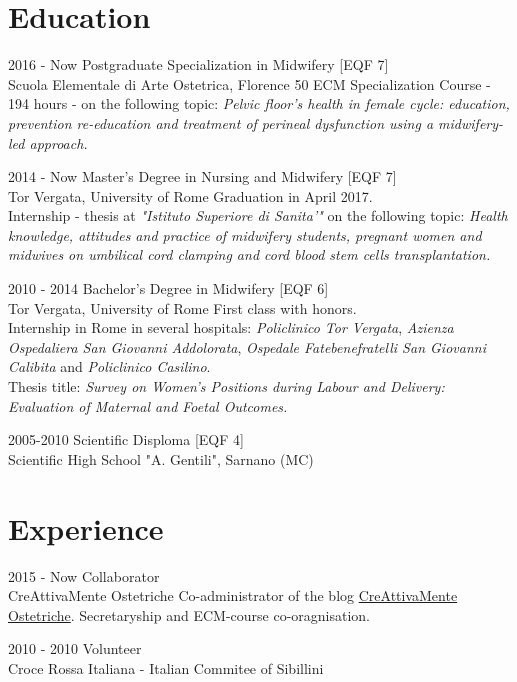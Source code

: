 \documentclass[]{friggeri-cv}
\begin{document}
\section{Education}
\begin{entrylist}
	\entry
	{2016 - Now}
	{Postgraduate Specialization in Midwifery [\small EQF 7]}
	{\\Scuola Elementale di Arte Ostetrica, Florence}
	{50 ECM Specialization Course - 194 hours - on the following topic: \emph{Pelvic floor's health in female cycle: education, prevention re-education and treatment of perineal dysfunction using a midwifery-led approach.}\\}
	
	\entry
	{2014 - Now}
	{Master's Degree in Nursing and Midwifery [\small EQF 7]}
	{\\Tor Vergata, University of Rome}
	{Graduation in April 2017. \\Internship - thesis at \textit{"Istituto Superiore di Sanita'"} on the following topic: \textit{Health knowledge, attitudes and practice of midwifery students, pregnant women and midwives on umbilical cord clamping and cord blood stem cells transplantation.}\\}
	
	\entry
	{2010 - 2014}
	{Bachelor's Degree in Midwifery [\small EQF 6]}
	{\\Tor Vergata, University of Rome}
	{First class with honors.\\
	Internship in Rome in several hospitals: \textit{Policlinico Tor Vergata}, \textit{Azienza Ospedaliera San Giovanni Addolorata}, \textit{Ospedale Fatebenefratelli San Giovanni Calibita} and \textit{Policlinico Casilino}.\\
	Thesis title: \textit{Survey on Women's Positions during Labour and Delivery: Evaluation of Maternal and Foetal Outcomes.}\\}

	\entry
	{2005-2010}
	{Scientific Disploma [\small EQF 4]}
	{\\Scientific High School "A. Gentili", Sarnano (MC)}
	{}
\end{entrylist}

\section{Experience}
\begin{entrylist}
  \entry
  {2015 - Now}
  {Collaborator}
  {\\CreAttivaMente Ostetriche}
  {Co-administrator of the blog \href{http://creattivamenteostetriche2012.blogspot.it/}{CreAttivaMente Ostetriche}. 
  	Secretaryship and ECM-course co-oragnisation.\\}
  
  \entry
    {2010 - 2010}
    {Volunteer}
    {\\Croce Rossa Italiana - Italian Commitee of Sibillini}
    {\\}
\end{entrylist}
\end{document}
